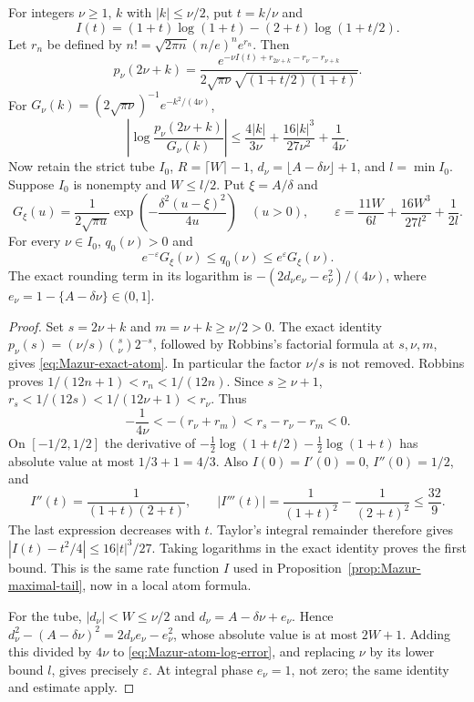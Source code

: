 \begin{proposition}
\label{prop:Mazur-atom-gaussian}
For integers $\nu\ge1$, $k$ with $|k|\le\nu/2$, put $t=k/\nu$ and
\[
 I(t)=(1+t)\log(1+t)-(2+t)\log(1+t/2).
\]
Let $r_n$ be defined by
$n!=\sqrt{2\pi n}(n/e)^n e^{r_n}$. Then
\begin{equation}
 p_\nu(2\nu+k)=\frac{e^{-\nu I(t)+r_{2\nu+k}-r_\nu-r_{\nu+k}}}
 {2\sqrt{\pi\nu}\sqrt{(1+t/2)(1+t)}}.
 \label{eq:Mazur-exact-atom}
\end{equation}
For $G_\nu(k)=(2\sqrt{\pi\nu})^{-1}e^{-k^2/(4\nu)}$,
\begin{equation}
 \left|\log\frac{p_\nu(2\nu+k)}{G_\nu(k)}\right|
 \le\frac{4|k|}{3\nu}+\frac{16|k|^3}{27\nu^2}+\frac1{4\nu}.
 \label{eq:Mazur-atom-log-error}
\end{equation}
Now retain the strict tube $I_0$, $R=\lceil W\rceil-1$,
$d_\nu=\lfloor A-\delta\nu\rfloor+1$, and $l=\min I_0$.
Suppose $I_0$ is nonempty and $W\le l/2$. Put $\xi=A/\delta$ and
\[
 G_\xi(u)=\frac1{2\sqrt{\pi u}}
    \exp\!\left(-\frac{\delta^2(u-\xi)^2}{4u}\right)\quad(u>0),
 \qquad
 \varepsilon=\frac{11W}{6l}+\frac{16W^3}{27l^2}+\frac1{2l}.
\]
For every $\nu\in I_0$, $q_0(\nu)>0$ and
\begin{equation}
 e^{-\varepsilon}G_\xi(\nu)\le q_0(\nu)
                  \le e^\varepsilon G_\xi(\nu).
 \label{eq:Mazur-rounded-gaussian}
\end{equation}
The exact rounding term in its logarithm is
$-(2d_\nu e_\nu-e_\nu^2)/(4\nu)$, where
$e_\nu=1-\{A-\delta\nu\}\in(0,1]$.
\end{proposition}
\begin{proof}
Set $s=2\nu+k$ and $m=\nu+k\ge\nu/2>0$. The exact identity
$p_\nu(s)=(\nu/s)\binom{s}{\nu}2^{-s}$, followed by Robbins's
factorial formula at $s,\nu,m$, gives
\eqref{eq:Mazur-exact-atom}. In particular the factor $\nu/s$
is not removed. Robbins proves
$1/(12n+1)<r_n<1/(12n)$.
Since $s\ge\nu+1$,
$r_s<1/(12s)<1/(12\nu+1)<r_\nu$. Thus
\[
 -\frac1{4\nu}<-(r_\nu+r_m)<r_s-r_\nu-r_m<0.
\]
On $[-1/2,1/2]$ the derivative of
$-\tfrac12\log(1+t/2)-\tfrac12\log(1+t)$ has absolute value
at most $1/3+1=4/3$.
Also $I(0)=I'(0)=0$, $I''(0)=1/2$, and
\[
 I''(t)=\frac1{(1+t)(2+t)},\qquad
 |I'''(t)|=\frac1{(1+t)^2}-\frac1{(2+t)^2}\le\frac{32}{9}.
\]
The last expression decreases with $t$. Taylor's integral remainder
therefore gives $|I(t)-t^2/4|\le16|t|^3/27$.
Taking logarithms in the exact identity proves the first bound.
This is the same rate function $I$ used in
Proposition~\ref{prop:Mazur-maximal-tail}, now in a local atom formula.

For the tube, $|d_\nu|<W\le\nu/2$ and
$d_\nu=A-\delta\nu+e_\nu$. Hence
$d_\nu^2-(A-\delta\nu)^2=2d_\nu e_\nu-e_\nu^2$,
whose absolute value is at most $2W+1$.
Adding this divided by $4\nu$ to
\eqref{eq:Mazur-atom-log-error}, and replacing $\nu$ by its lower
bound $l$, gives precisely $\varepsilon$. At integral phase
$e_\nu=1$, not zero; the same identity and estimate apply.
\end{proof}


